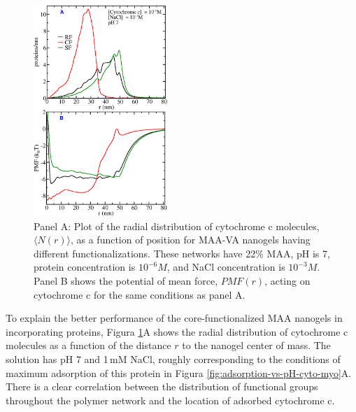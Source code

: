 
\begin{figure}[!htb]
     \centering
     \includegraphics[width=0.45\textwidth]{Figures/graphs-gel2/cyto-adsr-pmf.png}
     \caption{Panel A: Plot of the radial distribution  of cytochrome c molecules, $\langle N(r)\rangle$, as a function of position for MAA-VA nanogels having different functionalizations.
     These networks have 22\% MAA, pH is 7, protein concentration is $10^{-6}M$, and NaCl concentration is $10^{-3}M$.
     Panel B shows the potential of mean force, ${PMF}(r)$, acting on cytochrome c for the same conditions as panel A.}
     \label{fig:adsorption-vs-r-cyto}
 \end{figure}

To explain the better performance of the core-functionalized MAA nanogels in incorporating proteins, 
Figura \ref{fig:adsorption-vs-r-cyto}A shows the radial distribution of cytochrome c molecules as a function of the distance $r$ to the nanogel center of mass.
The solution has pH 7 and 1\,mM NaCl, roughly corresponding to the conditions of maximum  adsorption of this protein in Figura \ref{fig:adsorption-vs-pH-cyto-myo}A.
There is a clear correlation between the  distribution of functional groups throughout the polymer network and the location of adsorbed cytochrome c.

